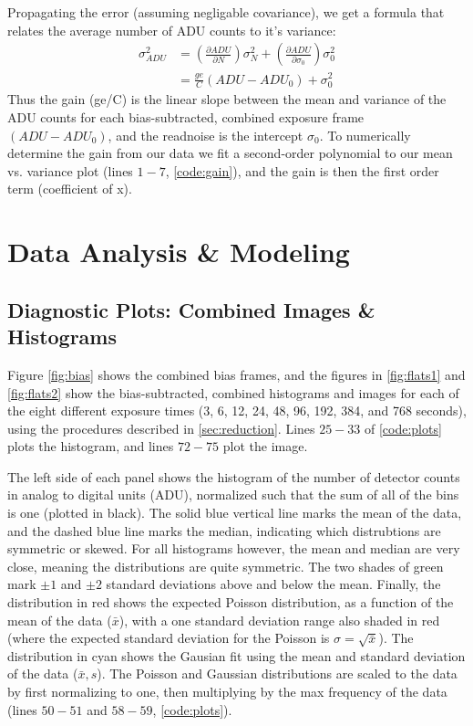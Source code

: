 \documentclass[preprint]{aastex62}
\begin{document}
Propagating the error (assuming negligable covariance), we get a formula that relates the average number of ADU counts to it's variance:
\begin{align}
\sigma_{ADU}^2 &= \left(\frac{\partial ADU}{\partial N} \right) \sigma_N^2 + 
    \left(\frac{\partial ADU}{\partial \sigma_0} \right) \sigma_0^2 \\
    &= \frac{ge}{C} \left(ADU - ADU_0 \right) + \sigma_0^2
\end{align}
Thus the gain (ge/C) is the linear slope between the mean and variance of the ADU counts for each bias-subtracted, combined exposure frame $\left(ADU - ADU_0 \right)$, and the readnoise is the intercept $\sigma_0$. To numerically determine the gain from our data we fit a second-order polynomial to our mean vs. variance plot (lines $1-7$, \ref{code:gain}), and the gain is then the first order term (coefficient of x).

\section{Data Analysis \& Modeling}

\subsection{Diagnostic Plots: Combined Images \& Histograms} \label{subsec:diagnostic}
Figure \ref{fig:bias} shows the combined bias frames, and the figures in \ref{fig:flats1} and \ref{fig:flats2} show the bias-subtracted, combined histograms and images for each of the eight different exposure times (3, 6, 12, 24, 48, 96, 192, 384, and 768 seconds), using the procedures described in \ref{sec:reduction}. Lines $25-33$ of \ref{code:plots} plots the histogram, and lines $72-75$ plot the image.

The left side of each panel shows the histogram of the number of detector counts in analog to digital units (ADU), normalized such that the sum of all of the bins is one (plotted in black). The solid blue vertical line marks the mean of the data, and the dashed blue line marks the median, indicating which distrubtions are symmetric or skewed. For all histograms however, the mean and median are very close, meaning the distributions are quite symmetric. The two shades of green mark $\pm1$ and $\pm2$ standard deviations above and below the mean. Finally, the distribution in red shows the expected Poisson distribution, as a function of the mean of the data ($\bar{x}$), with a one standard deviation range also shaded in red (where the expected standard deviation for the Poisson is $\sigma=\sqrt{\bar{x}}$). The distribution in cyan shows the Gausian fit using the mean and standard deviation of the data ($\bar{x}, s$). The Poisson and Gaussian distributions are scaled to the data by first normalizing to one, then multiplying by the max frequency of the data (lines $50-51$ and $58-59$, \ref{code:plots}).
\end{document}
